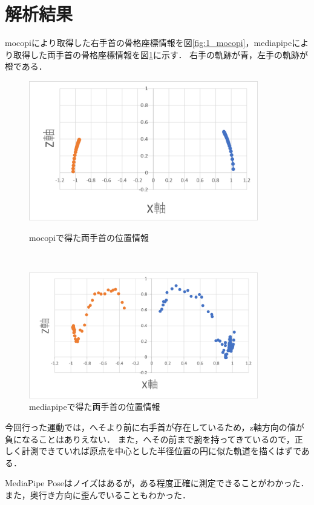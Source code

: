 \documentclass[a4j, fleqn, 12pt]{jsreport}
\begin{document}
\section{解析結果}
mocopiにより取得した右手首の骨格座標情報を図\ref{fig:1_mocopi}，mediapipeにより取得した両手首の骨格座標情報を図\ref{fig:1_media}に示す．
右手の軌跡が青，左手の軌跡が橙である．

\begin{figure}[h]
  \centering
  \begin{minipage}{10cm}
    \centering
    \includegraphics[width=10cm]{img/1_mocopi.png}
    \caption{mocopiで得た両手首の位置情報}
    \label{fig:1_mocopi}
  \end{minipage}\\
  \begin{minipage}{10cm}
    \centering
    \includegraphics[width=10cm]{img/1_media.png}
    \caption{mediapipeで得た両手首の位置情報}
    \label{fig:1_media}
  \end{minipage}
\end{figure}
今回行った運動では，へそより前に右手首が存在しているため，z軸方向の値が負になることはありえない．
また，へその前まで腕を持ってきているので，正しく計測できていれば原点を中心とした半径位置の円に似た軌道を描くはずである．

MediaPipe Poseはノイズはあるが，ある程度正確に測定できることがわかった．
また，奥行き方向に歪んでいることもわかった．
\end{document}
